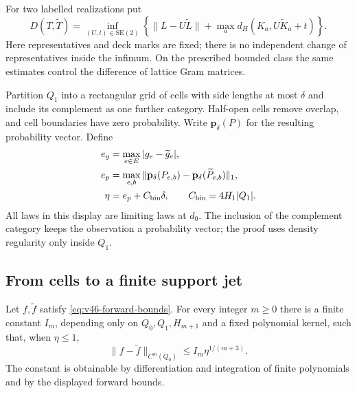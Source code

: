 For two labelled realizations put
\begin{equation}\label{eq:v46-table-distance}
 D(T,\widetilde T)=\inf_{(U,t)\in\mathrm{SE}(2)}
 \left\{\|L-U\widetilde L\|+
       \max_a d_H(K_a,U\widetilde K_a+t)\right\}.
\end{equation}
Here representatives and deck marks are fixed; there is no independent
change of representatives inside the infimum.  On the prescribed bounded
class the same estimates control the difference of lattice Gram matrices.

Partition $Q_1$ into a rectangular grid of cells with side lengths at most
$\delta$ and include its complement as one further category.  Half-open
cells remove overlap, and cell boundaries have zero probability.  Write
$\mathbf p_\delta(P)$ for the resulting probability vector.  Define
\begin{align}
 e_g&=\max_{e\in E}|g_e-\widetilde g_e|,\nonumber\\
 e_p&=\max_{e,b}\|\mathbf p_\delta(P_{e,b})-
                   \mathbf p_\delta(\widetilde P_{e,b})\|_1,
       \label{eq:v46-observation-error}\\
 \eta&=e_p+C_{\rm bin}\delta,
 \qquad C_{\rm bin}=4H_1|Q_1|.\nonumber
\end{align}
All laws in this display are limiting laws at $d_0$.  The inclusion of the
complement category keeps the observation a probability vector; the proof
uses density regularity only inside $Q_1$.

\subsection{From cells to a finite support jet}

\begin{lemma}
\label{lem:v46-cell-interpolation}
Let $f,\widetilde f$ satisfy \eqref{eq:v46-forward-bounds}.  For every
integer $m\ge0$ there is a finite constant $I_m$, depending only on
$Q_0,Q_1,H_{m+1}$ and a fixed polynomial kernel, such that, when $\eta\le1$,
\begin{equation}\label{eq:v46-interpolation}
 \|f-\widetilde f\|_{C^m(Q_0)}\le I_m\eta^{1/(m+3)}.
\end{equation}
The constant is obtainable by differentiation and integration of finite
polynomials and by the displayed forward bounds.
\end{lemma}

